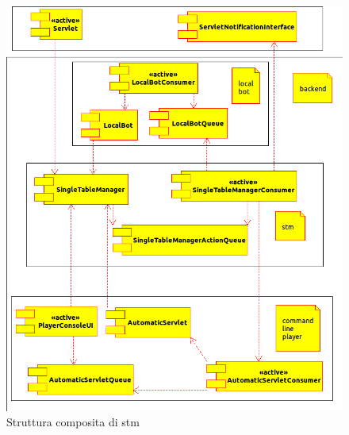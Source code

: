 \begin{figure}
  \begin{center}
    \includegraphics[scale=0.5]{backend_composit_structure.png}  
  \end{center}
  \caption{Struttura composita di stm}
  \label{fig:struttura composita di stm}
\end{figure}

